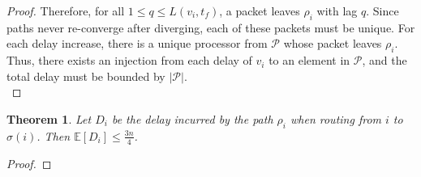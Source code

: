 \documentclass[psamsfonts, 10pt]{amsart}
\newtheorem{thm}{Theorem}[section]
\theoremstyle{definition}
\theoremstyle{remark}
\numberwithin{equation}{section}
\newcommand{\E}{\mathbb{E}}
\begin{document}
\begin{proof}
Therefore, for all $1 \leq q \leq L(v_i, t_f)$, a packet leaves $\rho_i$ with lag $q$. Since paths never re-converge after diverging, each of these packets must be unique. For each delay increase, there is a unique processor from $\mathcal{P}$ whose packet leaves $\rho_i$. Thus, there exists an injection from each delay of $v_i$ to an element in $\mathcal{P}$, and the total delay must be bounded by $\lvert \mathcal{P} \rvert$.\\
\end{proof}

\begin{thm}
Let $D_i$ be the delay incurred by the path $\rho_i$ when routing from $i$ to $\sigma(i)$. Then $\E[D_i] \leq \frac{3n}{4}$.
\end{thm}

\begin{proof}

\iffalse
We define the delay $D_i$ incurred on a path $\rho_i$ to be the total amount of steps that the packet $v_i$ is not transmitted over a communication link, but rather waiting in a queue. We define $D$ as $\sum_{i=0}^{N-1}D_i$. So, 
\[
\E[D] = \sum_{i=1}^{N-1} \E[D_i]
\]
\fi


\end{proof}
\end{document}
